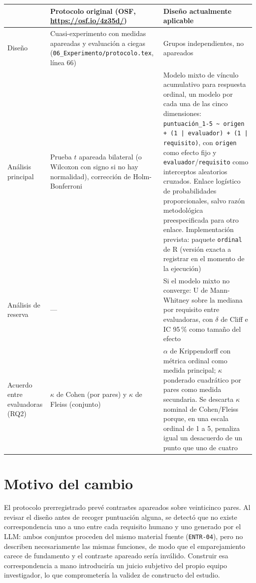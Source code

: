 \documentclass[11pt,a4paper]{article}
\begin{document}
\begin{longtable}{|L{3.0cm}|L{6.1cm}|L{6.1cm}|}
\hline
{}
\textbf{} & \textbf{Protocolo original (OSF, \url{https://osf.io/4z35d/})} & \textbf{Diseño actualmente aplicable} \\ \hline
\endhead
Diseño &
Cuasi-experimento con medidas apareadas y evaluación a ciegas (\texttt{06\_Experimento/protocolo.tex}, línea 66) &
Grupos independientes, no apareados \\ \hline
Análisis principal &
Prueba $t$ apareada bilateral (o Wilcoxon con signo si no hay normalidad), corrección de Holm-Bonferroni &
Modelo mixto de vínculo acumulativo para respuesta ordinal, un modelo por cada una de las cinco dimensiones: \texttt{puntuación\_1-5 \textasciitilde{} origen + (1 | evaluador) + (1 | requisito)}, con \texttt{origen} como efecto fijo y \texttt{evaluador}/\texttt{requisito} como interceptos aleatorios cruzados. Enlace logístico de probabilidades proporcionales, salvo razón metodológica preespecificada para otro enlace. Implementación prevista: paquete \texttt{ordinal} de R (versión exacta a registrar en el momento de la ejecución) \\ \hline
Análisis de reserva &
--- &
Si el modelo mixto no converge: U de Mann-Whitney sobre la mediana por requisito entre evaluadoras, con $\delta$ de Cliff e IC 95\,\% como tamaño del efecto \\ \hline
Acuerdo entre evaluadoras (RQ2) &
$\kappa$ de Cohen (por pares) y $\kappa$ de Fleiss (conjunto) &
$\alpha$ de Krippendorff con métrica ordinal como medida principal; $\kappa$ ponderado cuadrático por pares como medida secundaria. Se descarta $\kappa$ nominal de Cohen/Fleiss porque, en una escala ordinal de 1 a 5, penaliza igual un desacuerdo de un punto que uno de cuatro \\ \hline
\end{longtable}

\section{Motivo del cambio}

El protocolo prerregistrado prevé contrastes apareados sobre veinticinco
pares. Al revisar el diseño antes de recoger puntuación alguna, se detectó
que no existe correspondencia uno a uno entre cada requisito humano y uno
generado por el LLM: ambos conjuntos proceden del mismo material fuente
(\texttt{ENTR-04}), pero no describen necesariamente las mismas funciones,
de modo que el emparejamiento carece de fundamento y el contraste apareado
sería inválido. Construir esa correspondencia a mano introduciría un juicio
subjetivo del propio equipo investigador, lo que comprometería la validez
de constructo del estudio.
\end{document}
